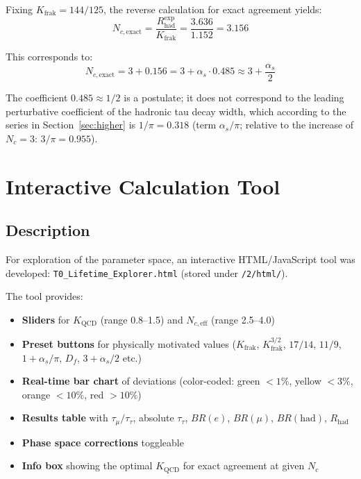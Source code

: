 	Fixing $K_\text{frak} = 144/125$, the reverse calculation for exact agreement yields:
	\begin{equation}
		N_{c,\text{exact}} = \frac{R_\text{had}^\text{exp}}{K_\text{frak}} = \frac{3.636}{1.152} = 3.156
	\end{equation}
	
	This corresponds to:
	\begin{equation}
		N_{c,\text{exact}} = 3 + 0.156 = 3 + \alpha_s \cdot 0.485 \approx 3 + \frac{\alpha_s}{2}
	\end{equation}
	
	The coefficient $0.485 \approx 1/2$ is a postulate; it does not correspond to the leading perturbative coefficient of the hadronic tau decay width, which according to the series in Section~\ref{sec:higher} is $1/\pi = 0.318$ (term $\alpha_s/\pi$; relative to the increase of $N_c = 3$: $3/\pi = 0.955$).
	
	
	\section{Interactive Calculation Tool}
	
	\subsection{Description}
	
	For exploration of the parameter space, an interactive HTML/JavaScript tool was developed: \texttt{T0\_Lifetime\_Explorer.html} (stored under \texttt{/2/html/}).
	
	The tool provides:
	\begin{itemize}
		\item \textbf{Sliders} for $K_\text{QCD}$ (range 0.8--1.5) and $N_{c,\text{eff}}$ (range 2.5--4.0)
		\item \textbf{Preset buttons} for physically motivated values ($K_\text{frak}$, $K_\text{frak}^{3/2}$, $17/14$, $11/9$, $1+\alpha_s/\pi$, $D_f$, $3+\alpha_s/2$ etc.)
		\item \textbf{Real-time bar chart} of deviations (color-coded: green $<1\%$, yellow $<3\%$, orange $<10\%$, red $>10\%$)
		\item \textbf{Results table} with $\tau_\mu/\tau_\tau$, absolute $\tau_\tau$, $BR(e)$, $BR(\mu)$, $BR(\text{had})$, $R_\text{had}$
		\item \textbf{Phase space corrections} toggleable
		\item \textbf{Info box} showing the optimal $K_\text{QCD}$ for exact agreement at given $N_c$
	\end{itemize}
	
